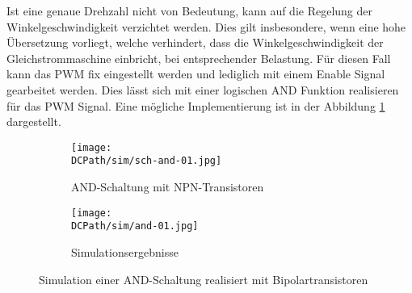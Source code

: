 \noindent Ist eine genaue Drehzahl nicht von Bedeutung, kann auf die Regelung der
Winkelgeschwindigkeit verzichtet werden. Dies gilt insbesondere, wenn eine
hohe Übersetzung vorliegt, welche verhindert, dass die Winkelgeschwindigkeit
der Gleichstrommaschine einbricht, bei entsprechender Belastung. Für diesen
Fall kann das PWM fix eingestellt werden und lediglich mit einem Enable
Signal gearbeitet werden. Dies lässt sich mit einer logischen AND Funktion
realisieren für das PWM Signal. Eine mögliche Implementierung ist in der
Abbildung \ref{fig:and} dargestellt.

\begin{figure}[h!]
    \centering
    \begin{subfigure}[b]{0.45\textwidth}
        \texttt{[image: \\DCPath/sim/sch-and-01.jpg]}
        \caption{AND-Schaltung mit NPN-Transistoren}
    \end{subfigure}
    \begin{subfigure}[b]{0.45\textwidth}
        \texttt{[image: \\DCPath/sim/and-01.jpg]}
        \caption{Simulationsergebnisse}
    \end{subfigure}
    \caption{Simulation einer AND-Schaltung realisiert mit
        Bipolartransistoren}
    \label{fig:and}
\end{figure}


